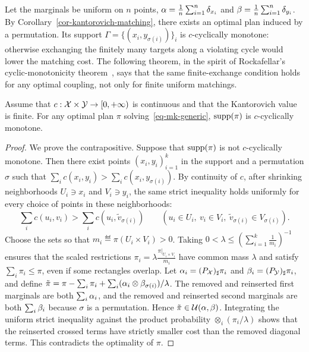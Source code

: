 Let the marginals be uniform on $n$ points, $\alpha=\frac1n\sum_{i=1}^n\delta_{x_i}$ and $\beta=\frac1n\sum_{i=1}^n\delta_{y_i}$. By Corollary~\ref{cor-kantorovich-matching}, there exists an optimal plan induced by a permutation. Its support $\Gamma=\{(x_i,y_{\sigma(i)})\}_i$ is $c$-cyclically monotone: otherwise exchanging the finitely many targets along a violating cycle would lower the matching cost. The following theorem, in the spirit of Rockafellar's cyclic-monotonicity theorem~\cite{rockafellar2015convex}, says that the same finite-exchange condition holds for any optimal coupling, not only for finite uniform matchings.

\begin{thm}\label{thm:opt_ccm}
		Assume that $c:\mathcal{X}\times\mathcal{Y}\to[0,+\infty)$ is continuous and that the Kantorovich value is finite. For any optimal plan $\pi$ solving~\eqref{eq-mk-generic}, $\operatorname{supp}(\pi)$ is $c$-cyclically monotone.
\end{thm}
\begin{proof}
	We prove the contrapositive. Suppose that $\operatorname{supp}(\pi)$ is not $c$-cyclically monotone. Then there exist points $(x_i,y_i)_{i=1}^k$ in the support and a permutation $\sigma$ such that $\sum_i c(x_i,y_i)>\sum_i c(x_i,y_{\sigma(i)})$.
	By continuity of $c$, after shrinking neighborhoods $U_i\ni x_i$ and $V_i\ni y_i$, the same strict inequality holds uniformly for every choice of points in these neighborhoods:
	\[
		\sum_i c(u_i,v_i)
		>
		\sum_i c(u_i,\tilde v_{\sigma(i)})
		\qquad
		(u_i\in U_i,\ v_i\in V_i,\ \tilde v_{\sigma(i)}\in V_{\sigma(i)}).
	\]
		Choose the sets so that $m_i\eqdef\pi(U_i\times V_i)>0$. Taking
		\(0<\lambda\leq\left(\sum_{i=1}^k\frac1{m_i}\right)^{-1}\)
		ensures that the scaled restrictions
		\(\pi_i=\lambda\frac{\pi|_{U_i\times V_i}}{m_i}\)
		have common mass $\lambda$ and satisfy $\sum_i\pi_i\leq\pi$, even if some rectangles overlap. Let $\alpha_i=(P_{\mathcal{X}})_\sharp\pi_i$ and $\beta_i=(P_{\mathcal{Y}})_\sharp\pi_i$, and define $\tilde\pi=\pi-\sum_i\pi_i+\sum_i(\alpha_i\otimes\beta_{\sigma(i)})/\lambda$.
	The removed and reinserted first marginals are both $\sum_i\alpha_i$, and the removed and reinserted second marginals are both $\sum_i\beta_i$ because $\sigma$ is a permutation. Hence $\tilde\pi\in\mathcal{U}(\alpha,\beta)$. Integrating the uniform strict inequality against the product probability $\otimes_i(\pi_i/\lambda)$ shows that the reinserted crossed terms have strictly smaller cost than the removed diagonal terms. This contradicts the optimality of $\pi$.
\end{proof}

